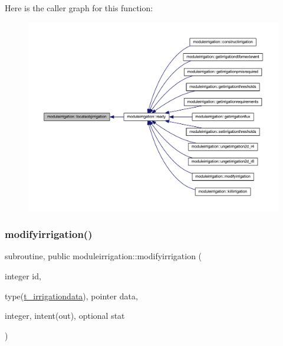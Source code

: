 Here is the caller graph for this function\+:\nopagebreak
\begin{figure}[H]
\begin{center}
\leavevmode
\includegraphics[width=350pt]{namespacemoduleirrigation_ae56505ddeb0553538b6cc26774184d2a_icgraph}
\end{center}
\end{figure}
\mbox{\label{namespacemoduleirrigation_a1b4b8c33ee265298e1bf3cb4d19f6762}} 
\subsubsection{\texorpdfstring{modifyirrigation()}{modifyirrigation()}}
{\footnotesize\ttfamily subroutine, public moduleirrigation\+::modifyirrigation (\begin{DoxyParamCaption}\item[{integer}]{id,  }\item[{type(\mbox{\hyperlink{structmoduleirrigation_1_1t__irrigationdata}{t\+\_\+irrigationdata}}), pointer}]{data,  }\item[{integer, intent(out), optional}]{stat }\end{DoxyParamCaption})}

